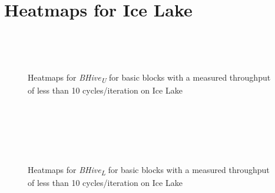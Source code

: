 \documentclass[sigconf,nonacm]{acmart}
\newcommand{\bhivel}{\emph{BHive\textsubscript{L}}\xspace}
\newcommand{\bhiveu}{\emph{BHive\textsubscript{U}}\xspace}
\begin{document}
\section{Heatmaps for Ice Lake}
\vfill
\begin{figure}[H]
\centering
\begin{subfigure}[t]{0.33\textwidth}\end{subfigure}~
\begin{subfigure}[t]{0.33\textwidth}\end{subfigure}~
\begin{subfigure}[t]{0.33\textwidth}\end{subfigure}\par\bigskip

\begin{subfigure}[t]{0.33\textwidth}\end{subfigure}
\caption{Heatmaps for \bhiveu for basic blocks with a measured throughput of less than 10 cycles/iteration on Ice Lake}
\end{figure}
\vfill

\newpage
\mbox{}
\vfill
\begin{figure}[H]
\centering
\begin{subfigure}[t]{0.33\textwidth}\end{subfigure}~
\begin{subfigure}[t]{0.33\textwidth}\end{subfigure}~
\begin{subfigure}[t]{0.33\textwidth}\end{subfigure}\par\bigskip

\begin{subfigure}[t]{0.33\textwidth}\end{subfigure}~
\begin{subfigure}[t]{0.33\textwidth}\end{subfigure}
\caption{Heatmaps for \bhivel for basic blocks with a measured throughput of less than 10 cycles/iteration on Ice Lake}
\end{figure}
\vfill
\end{document}
